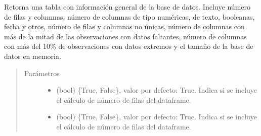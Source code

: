 \documentclass[letterpaper,10pt,openany,spanish]{sphinxmanual}
\begin{document}
\begin{fulllineitems}
\begin{fulllineitems}
\end{fulllineitems}


\begin{fulllineitems}
\label{\detokenize{calidad_datos:calidad_datos.CalidadDatos.Resumen}}
Retorna una tabla con información general de la base de datos.        Incluye número de filas y columnas, número de columnas de tipo         numéricas, de texto, booleanas, fecha y otros, número de filas y         columnas no únicas, número de columnas con más de la mitad de las         observaciones con datos faltantes, número de columnas con más del         10\% de observaciones con datos extremos y el tamaño de la base de         datos en memoria.
\begin{quote}\begin{description}
\item[{Parámetros}] \leavevmode\begin{itemize}
\item {} 
 \textendash{} (bool) \{True, False\}, valor por defecto: True. Indica             si se incluye el cálculo de número de filas del dataframe.

\item {} 
 \textendash{} (bool) \{True, False\}, valor por defecto: True.             Indica si se incluye el cálculo de número de filas del dataframe.


\end{itemize}
\end{description}
\end{quote}
\end{fulllineitems}
\end{fulllineitems}
\end{document}
